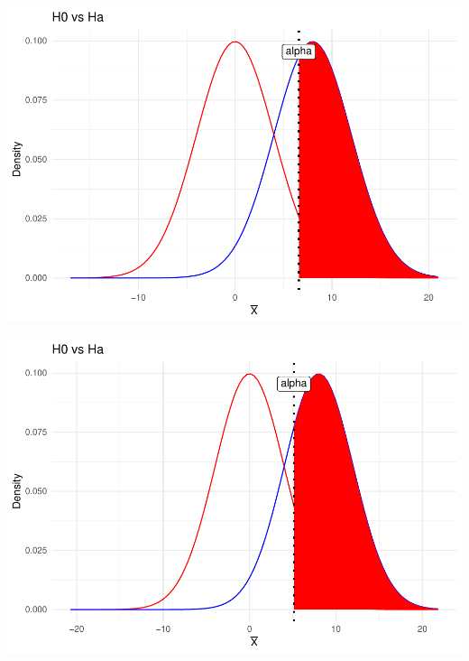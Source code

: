 \documentclass[]{article}
\newenvironment{Shaded}{\begin{snugshade}}{\end{snugshade}}
\newcommand{\FunctionTok}[1]{\textcolor[rgb]{0.00,0.00,0.00}{#1}}
\newcommand{\NormalTok}[1]{#1}
\newcommand{\SpecialCharTok}[1]{\textcolor[rgb]{0.00,0.00,0.00}{#1}}
\begin{document}
\begin{Shaded}
\end{Shaded}

\includegraphics{Enunciado_Tarea_3_files/figure-latex/unnamed-chunk-3-2.pdf}

\begin{Shaded}
\end{Shaded}

\includegraphics{Enunciado_Tarea_3_files/figure-latex/unnamed-chunk-3-3.pdf}
\end{document}
